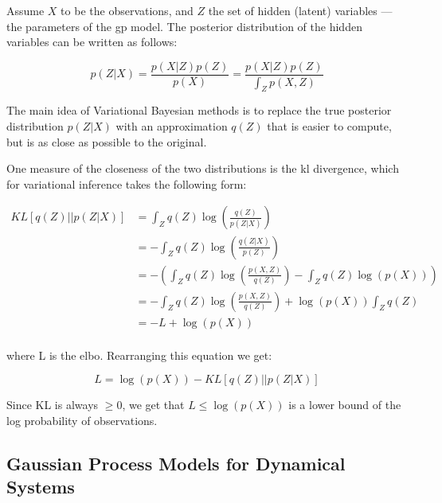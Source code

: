 Assume $X$ to be the observations, and $Z$ the set of hidden (latent)
variables --- the parameters of the \acrshort{gp} model. The posterior
distribution of the hidden variables can be written as follows:

\begin{equation}
    p(Z|X) = \frac{p(X|Z)p(Z)}{p(X)} = \frac{p(X|Z)p(Z)}{\int_Z p(X,Z)}
\end{equation}

The main idea of Variational Bayesian methods is to replace the true posterior
distribution $p(Z|X)$ with an approximation $q(Z)$ that is easier to compute,
but is as close as possible to the original. 

One measure of the closeness of the two distributions is the \acrfull{kl}
divergence, which for variational inference takes the following form:


\vspace{5pt}
\begin{equation}
    \begin{aligned}
        KL\left[q(Z)||p(Z|X)\right] 
        &= \int_Z q(Z)\log{\left(\frac{q(Z)}{p(Z|X)}\right)} \\
        &= - \int_Z q(Z)\log{\left(\frac{q(Z|X)}{p(Z)}\right)} \\
        &= - \left(
                \int_Z q(Z)\log{\left(\frac{p(X,Z)}{q(Z)}\right)}
                        - \int_Z q(Z)\log{\left(p(X)\right)}
            \right) \\
        &= - \int_Z q(Z) \log{\left(\frac{p(X,Z)}{q(Z)}\right)}
            + \log{\left(p(X)\right)}\int_Z q(Z) \\
        &= -L + \log{\left(p(X)\right)} \\
    \end{aligned}
\end{equation}
\vspace{5pt}

where L is the \acrfull{elbo}. Rearranging this equation we get: 

\begin{equation}
    L = \log{\left(p(X)\right)} - KL\left[q(Z)||p(Z|X)\right] 
\end{equation}

Since KL is always $\geq 0$, we get that $L \leq \log{\left(p(X)\right)}$ is a
lower bound of the log probability of observations.

\subsection{Gaussian Process Models for Dynamical
Systems}\label{sec:gp_dynamical_system}

